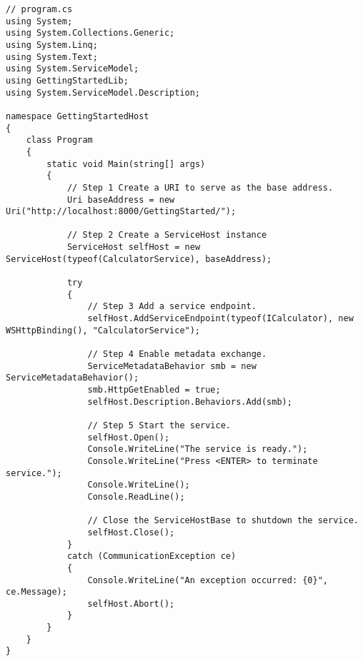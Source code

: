 \documentclass[a4paper,10pt]{scrreprt}
\begin{document}
\begin{lstlisting}[caption=wcf self host]
 // program.cs
using System;
using System.Collections.Generic;
using System.Linq;
using System.Text;
using System.ServiceModel;
using GettingStartedLib;
using System.ServiceModel.Description; 

namespace GettingStartedHost
{
    class Program
    {
        static void Main(string[] args)
        {
            // Step 1 Create a URI to serve as the base address.
            Uri baseAddress = new Uri("http://localhost:8000/GettingStarted/");

            // Step 2 Create a ServiceHost instance
            ServiceHost selfHost = new ServiceHost(typeof(CalculatorService), baseAddress);

            try
            {
                // Step 3 Add a service endpoint.
                selfHost.AddServiceEndpoint(typeof(ICalculator), new WSHttpBinding(), "CalculatorService");

                // Step 4 Enable metadata exchange.
                ServiceMetadataBehavior smb = new ServiceMetadataBehavior();
                smb.HttpGetEnabled = true;
                selfHost.Description.Behaviors.Add(smb);

                // Step 5 Start the service.
                selfHost.Open();
                Console.WriteLine("The service is ready.");
                Console.WriteLine("Press <ENTER> to terminate service.");
                Console.WriteLine();
                Console.ReadLine();

                // Close the ServiceHostBase to shutdown the service.
                selfHost.Close();
            }
            catch (CommunicationException ce)
            {
                Console.WriteLine("An exception occurred: {0}", ce.Message);
                selfHost.Abort();
            }
        }
    }
}
\end{lstlisting}
\end{document}
